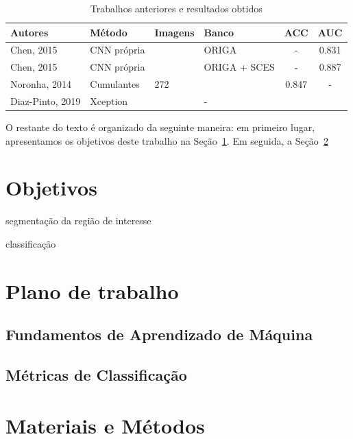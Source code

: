 \documentclass[12pt]{article}
\begin{document}
\begin{table}[htb]
    \centering
    \begin{tabular}{|l|l|l|l|c|c|}
    \hline
    Autores          & Método          & Imagens & Banco        & ACC     & AUC   \\
    \hline
    Chen, 2015       & CNN própria     &         & ORIGA        & -       & 0.831 \\
    \hline
    Chen, 2015       & CNN própria     &         & ORIGA + SCES & -       & 0.887 \\
    \hline
    Noronha, 2014    & Cumulantes      & 272     &              & 0.847  &  -     \\
    \hline
    Diaz-Pinto, 2019 & Xception        &         & -            &        &        \\
    \hline
    \end{tabular}
    \caption{Trabalhos anteriores e resultados obtidos}
    \label{tab:trabalhos}
\end{table}


\bigskip

O restante do texto é organizado da seguinte maneira: em primeiro lugar, apresentamos os objetivos deste trabalho na Seção~\ref{sec:objetivo}. Em seguida, a Seção~\ref{sec:revisao} 


\section{Objetivos}
\label{sec:objetivo}

segmentação da região de interesse

classificação 

\section{Plano de trabalho}
\label{sec:revisao}

\subsection{Fundamentos de Aprendizado de Máquina}
\label{sec:aprendizado}

\subsection{Métricas de Classificação}
\label{sec:metricas}


\section{Materiais e Métodos} 
\label{sec:metodos}
\end{document}

